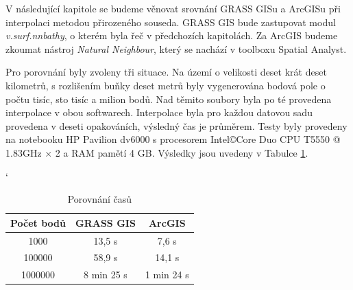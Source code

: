 \documentclass[12pt,a4paper]{article}
\begin{document}
V následující kapitole se budeme věnovat srovnání GRASS GISu a ArcGISu při interpolaci metodou přirozeného souseda. GRASS GIS bude zastupovat modul \emph{v.surf.nnbathy}, o kterém byla řeč v předchozích kapitolách. Za ArcGIS budeme zkoumat nástroj \emph{Natural Neighbour}, který se nachází v toolboxu Spatial Analyst. 

Pro porovnání byly zvoleny tři situace. Na území o velikosti deset krát deset kilometrů, s rozlišením buňky deset metrů byly vygenerována bodová pole o počtu tisíc, sto tisíc a milion bodů. Nad těmito soubory byla po té provedena interpolace v obou softwarech. Interpolace byla pro každou datovou sadu provedena v deseti opakováních, výsledný čas je průměrem. Testy byly provedeny na notebooku HP Pavilion dv6000 s procesorem Intel\copyright  Core Duo CPU T5550 @ 1.83GHz $\times$ 2 a RAM pamětí 4 GB. Výsledky jsou uvedeny v Tabulce \ref{tab:GRASSxArc}.

\bigskip
\begin{table}[h]
\catcode`
\begin{tabular}{|c|c|c|}
\hline
Počet bodů & GRASS GIS  & ArcGIS     \\ \hline
1000       & 13,5 s     & 7,6 s      \\ \hline
100000     & 58,9 s     & 14,1 s     \\ \hline
1000000    & 8 min 25 s & 1 min 24 s \\ \hline
\end{tabular}
\caption{Porovnání časů}
\label{tab:GRASSxArc}
\end{table}
\end{document}
